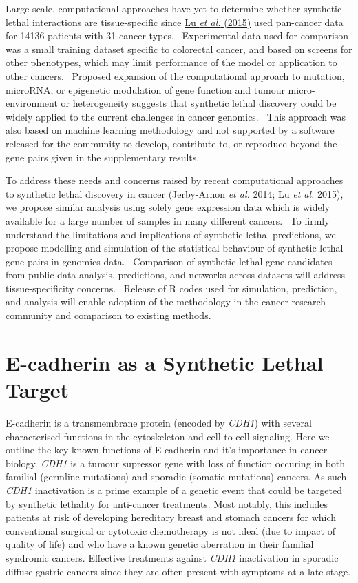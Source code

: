Large scale, computational approaches have yet to determine whether synthetic lethal interactions are tissue-specific since \hyperlink{ENREF74}{Lu}\hyperlink{ENREF74}{\textit{ et al.}}\hyperlink{ENREF74}{ (2015)} used pan-cancer data for 14136 patients with 31 cancer types. \ Experimental data used for comparison was a small training dataset specific to colorectal cancer, and based on screens for other phenotypes, which may limit performance of the model or application to other cancers. \ Proposed expansion of the computational approach to mutation, microRNA, or epigenetic modulation of gene function and tumour micro-environment or heterogeneity suggests that synthetic lethal discovery could be widely applied to the current challenges in cancer genomics. \ This approach was also based on machine learning methodology and not supported by a software released for the community to develop, contribute to, or reproduce beyond the gene pairs given in the supplementary results. 

To address these needs and concerns raised by recent computational approaches to synthetic lethal discovery in cancer (Jerby-Arnon\textit{ et al.} 2014; Lu\textit{ et al.} 2015), we propose similar analysis using solely gene expression data which is widely available for a large number of samples in many different cancers. \ To firmly understand the limitations and implications of synthetic lethal predictions, we propose modelling and simulation of the statistical behaviour of synthetic lethal gene pairs in genomics data. \ Comparison of synthetic lethal gene candidates from public data analysis, predictions, and networks across datasets will address tissue-specificity concerns. \ Release of R codes used for simulation, prediction, and analysis will enable adoption of the methodology in the cancer research community and comparison to existing methods. 


\section{E-cadherin as a Synthetic Lethal Target}

E-cadherin is a transmembrane protein (encoded by \textit{CDH1}) with several characterised functions in the cytoskeleton and cell-to-cell signaling. Here we outline the key known functions of E-cadherin and it's importance in cancer biology. \textit{CDH1} is a tumour supressor gene with loss of function occuring in both familial (germline mutations) and sporadic (somatic mutations) cancers. As such \textit{CDH1} inactivation is a prime example of a genetic event that could be targeted by synthetic lethality for anti-cancer treatments. Most notably, this includes patients at risk of developing hereditary breast and stomach cancers for which conventional surgical or cytotoxic chemotherapy is not ideal (due to impact of quality of life) and who have a known genetic aberration in their familial syndromic cancers. Effective treatments against \textit{CDH1} inactivation in sporadic diffuse gastric cancers since they are often present with symptoms at a late stage.


